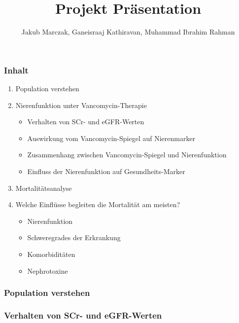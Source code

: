 \documentclass[10pt, aspectratio=169]{beamer}
\title{Projekt \MakeUppercase{\romannumeral 5}  Präsentation}
\author[J. Marczak, G. Kathiravan, M. I. Rahman]{Jakub Marczak, Ganeisraaj Kathiravan, Muhammad Ibrahim Rahman}
\begin{document}
\begin{frame}[plain]
  \titlepage
\end{frame}

\begin{frame}
    \frametitle{Inhalt}
    \begin{enumerate}
        \item Population verstehen
        \item Nierenfunktion unter Vancomycin-Therapie
        \begin{itemize} 
        \item[$\rightarrow$] Verhalten von SCr- und eGFR-Werten
        \item[$\rightarrow$] Auswirkung vom Vancomycin-Spiegel auf Nierenmarker
        \item[$\rightarrow$] Zusammenhang zwischen Vancomycin-Spiegel und Nierenfunktion
        \item[$\rightarrow$] Einfluss der Nierenfunktion auf Gesundheits-Marker
      \end{itemize}
        \item Mortalitätsanalyse
        \item[$\rightarrow$] Welche Einflüsse begleiten die Mortalität am meisten?
        \begin{itemize}
            \item Nierenfunktion
            \item Schweregrades der Erkrankung
            \item Komorbiditäten
            \item Nephrotoxine
        \end{itemize}
    \end{enumerate}
\end{frame}

\begin{frame}
    \frametitle{Population verstehen}
\end{frame}

\begin{frame}
    \frametitle{Verhalten von SCr- und eGFR-Werten}
\end{frame}
\end{document}
